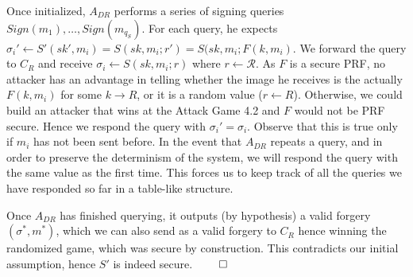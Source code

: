 Once initialized, $A_{DR}$ performs a series of signing queries $Sign(m_1), \dots, Sign(m_{q_S})$.
For each query, he expects $\sigma_i' \leftarrow S'(sk', m_i) = S(sk, m_i; r') = S(sk, m_i; F(k, m_i)$.
We forward the query to $C_R$ and receive $\sigma_i \leftarrow S(sk, m_i; r)$ where $r \leftarrow \mathcal{R}$.
As $F$ is a secure PRF, no attacker has an advantage in telling whether the image he receives is the actually $F(k, m_i)$ for some $k \rightarrow R$, or it is a random value ($r \leftarrow R$).
Otherwise, we could build an attacker that wins at the Attack Game 4.2 and $F$ would not be PRF secure.
Hence we respond the query with $\sigma_i' = \sigma_i$.
Observe that this is true only if $m_i$ has not been sent before.
In the event that $A_{DR}$ repeats a query, and in order to preserve the determinism of the system, we will respond the query with the same value as the first time.
This forces us to keep track of all the queries we have responded so far in a table-like structure.

Once $A_{DR}$ has finished querying, it outputs (by hypothesis) a valid forgery $(\sigma^*, m^*)$, which we can also send as a valid forgery to $C_R$ hence winning the randomized game, which was secure by construction.
This contradicts our initial assumption, hence $S'$ is indeed secure. \hfill $\qed$
